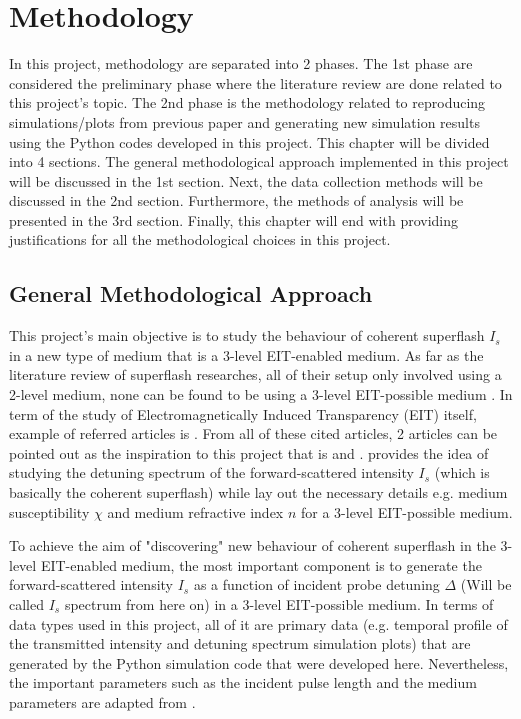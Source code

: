 \chapter{Methodology}
In this project, methodology are separated into 2 phases. The 1st phase are considered the preliminary phase where the literature review are done related to this project's topic. The 2nd phase is the methodology related to reproducing simulations/plots from previous paper and generating new simulation results using the Python codes developed in this project. This chapter will be divided into 4 sections. The general methodological approach implemented in this project will be discussed in the 1st section. Next, the data collection methods will be discussed in the 2nd section. Furthermore, the methods of analysis will be presented in the 3rd section. Finally, this chapter will end with providing justifications for all the methodological choices in this project.

\section{General Methodological Approach}
This project's main objective is to study the behaviour of coherent superflash $I_{s}$ in a new type of medium that is a 3-level EIT-enabled medium. As far as the literature review of superflash researches, all of their setup only involved using a 2-level medium, none can be found to be using a 3-level EIT-possible medium \cite{Kwong2014, Kwong2015, Kwong2017, Kwong2020}. In term of the study of Electromagnetically Induced Transparency (EIT) itself, example of referred articles is \cite{Gea-Banacloche1995, Braje2004}. From all of these cited articles, 2 articles can be pointed out as the inspiration to this project that is \cite{Kwong2014} and \cite{jeong2010slow}. \cite{Kwong2014} provides the idea of studying the detuning spectrum of the forward-scattered intensity $I_{s}$ (which is basically the coherent superflash) while \cite{jeong2010slow} lay out the necessary details e.g. medium susceptibility $\chi$ and medium refractive index $n$ for a 3-level EIT-possible medium.

To achieve the aim of "discovering" new behaviour of coherent superflash in the 3-level EIT-enabled medium, the most important component is to generate the forward-scattered intensity $I_{s}$ as a function of incident probe detuning $\Delta$ (Will be called $I_{s}$ spectrum from here on) in a 3-level EIT-possible medium. In terms of data types used in this project, all of it are primary data (e.g. temporal profile of the transmitted intensity and detuning spectrum simulation plots) that are generated by the Python simulation code that were developed here. Nevertheless, the important parameters such as the incident pulse length and the medium parameters are adapted from \cite{jeong2010slow}.

